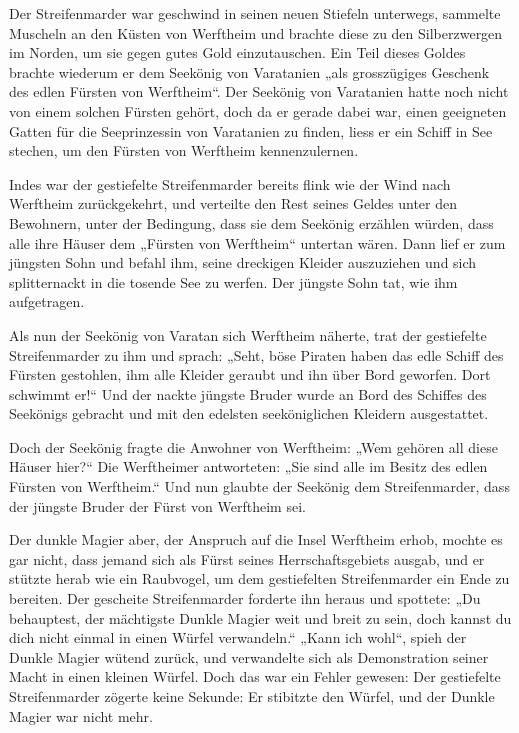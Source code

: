 \documentclass[10pt, a4paper, oneside]{book}
\begin{document}
Der Streifenmarder war geschwind in seinen neuen Stiefeln unterwegs, sammelte Muscheln an den Küsten von Werftheim und brachte diese zu den Silberzwergen im Norden, um sie gegen gutes Gold einzutauschen. Ein Teil dieses Goldes brachte wiederum er dem Seekönig von Varatanien „als grosszügiges Geschenk des edlen Fürsten von Werftheim“. Der Seekönig von Varatanien hatte noch nicht von einem solchen Fürsten gehört, doch da er gerade dabei war, einen geeigneten Gatten für die Seeprinzessin von Varatanien zu finden, liess er ein Schiff in See stechen, um den Fürsten von Werftheim kennenzulernen.

Indes war der gestiefelte Streifenmarder bereits flink wie der Wind nach Werftheim zurückgekehrt, und verteilte den Rest seines Geldes unter den Bewohnern, unter der Bedingung, dass sie dem Seekönig erzählen würden, dass alle ihre Häuser dem „Fürsten von Werftheim“ untertan wären. Dann lief er zum jüngsten Sohn und befahl ihm, seine dreckigen Kleider auszuziehen und sich splitternackt in die tosende See zu werfen. Der jüngste Sohn tat, wie ihm aufgetragen.

Als nun der Seekönig von Varatan sich Werftheim näherte, trat der gestiefelte Streifenmarder zu ihm und sprach: „Seht, böse Piraten haben das edle Schiff des Fürsten gestohlen, ihm alle Kleider geraubt und ihn über Bord geworfen. Dort schwimmt er!“ Und der nackte jüngste Bruder wurde an Bord des Schiffes des Seekönigs gebracht und mit den edelsten seeköniglichen Kleidern ausgestattet.

Doch der Seekönig fragte die Anwohner von Werftheim: „Wem gehören all diese Häuser hier?“ Die Werftheimer antworteten: „Sie sind alle im Besitz des edlen Fürsten von Werftheim.“ Und nun glaubte der Seekönig dem Streifenmarder, dass der jüngste Bruder der Fürst von Werftheim sei.

Der dunkle Magier aber, der Anspruch auf die Insel Werftheim erhob, mochte es gar nicht, dass jemand sich als Fürst seines Herrschaftsgebiets ausgab, und er stützte herab wie ein Raubvogel, um dem gestiefelten Streifenmarder ein Ende zu bereiten. Der gescheite Streifenmarder forderte ihn heraus und spottete: „Du behauptest, der mächtigste Dunkle Magier weit und breit zu sein, doch kannst du dich nicht einmal in einen Würfel verwandeln.“ „Kann ich wohl“, spieh der Dunkle Magier wütend zurück, und verwandelte sich als Demonstration seiner Macht in einen kleinen Würfel. Doch das war ein Fehler gewesen: Der gestiefelte Streifenmarder zögerte keine Sekunde: Er stibitzte den Würfel, und der Dunkle Magier war nicht mehr.
\end{document}
